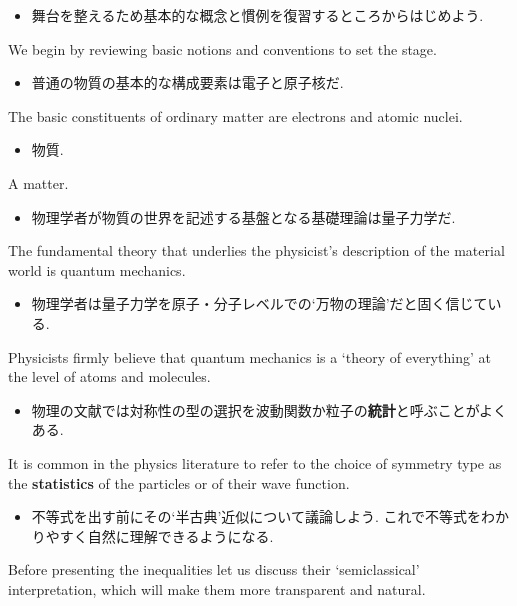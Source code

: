 \documentclass[openany, a4paper, oneside]{jsbook}
\begin{document}
\begin{itemize}
\item 舞台を整えるため基本的な概念と慣例を復習するところからはじめよう. \cite{AltmanKleiman1}
\end{itemize}
We begin by reviewing basic notions and conventions to set the stage.

\begin{itemize}
\item 普通の物質の基本的な構成要素は電子と原子核だ. \cite{LiebSeiringer1}
\end{itemize}
The basic constituents of ordinary matter are electrons and atomic nuclei.

\begin{itemize}
\item 物質.
\end{itemize}
A matter.

\begin{itemize}
\item 物理学者が物質の世界を記述する基盤となる基礎理論は量子力学だ. \cite{LiebSeiringer1}
\end{itemize}
The fundamental theory that underlies the physicist's description of the material world is quantum mechanics.

\begin{itemize}
\item 物理学者は量子力学を原子・分子レベルでの`万物の理論'だと固く信じている. \cite{LiebSeiringer1}
\end{itemize}
Physicists firmly believe that quantum mechanics is a `theory of everything' at the level of atoms and molecules.

\begin{itemize}
\item 物理の文献では対称性の型の選択を波動関数か粒子の\textbf{統計}と呼ぶことがよくある. \cite{LiebSeiringer1}
\end{itemize}
It is common in the physics literature to refer to the choice of symmetry type as the
\textbf{statistics} of the particles or of their wave function.

\begin{itemize}
\item 不等式を出す前にその`半古典'近似について議論しよう. これで不等式をわかりやすく自然に理解できるようになる. \cite{LiebSeiringer1}
\end{itemize}
Before presenting the inequalities let us discuss their `semiclassical' interpretation,
which will make them more transparent and natural.
\end{document}
